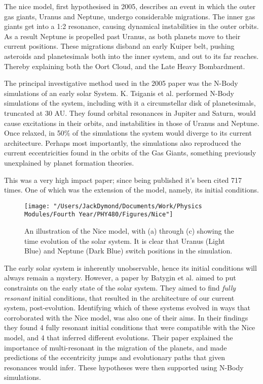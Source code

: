 \documentclass[a4paper,10pt]{article}
\begin{document}
The nice model, first hypothesised in 2005\cite{Nice}, describes an event in which the outer gas giants, Uranus and Neptune, undergo considerable migrations. The inner gas giants get into a 1:2 resonance, causing dynamical instabilities in the outer orbits. As a result Neptune is propelled past Uranus, as both planets move to their current positions. These migrations disband an early Kuiper belt, pushing asteroids and planetesimals both into the inner system, and out to its far reaches. Thereby explaining both the Oort Cloud, and the Late Heavy Bombardment. 

The principal investigative method used in the 2005 paper was the N-Body simulations of an early solar System. K. Tsiganis et al. performed N-Body simulations of the system, including with it a circumstellar disk of planetesimals, truncated at 30 AU. They found orbital resonances in Jupiter and Saturn, would cause excitations in their orbits, and instabilities in those of Uranus and Neptune. Once relaxed, in 50\% of the simulations the system would diverge to its current architecture. Perhaps most importantly, the simulations also reproduced the current eccentricities found in the orbits of the Gas Giants, something previously unexplained by planet formation theories.

This was a very high impact paper; since being published it's been cited 717 times. One of which was the extension of the model, namely, its initial conditions. 

\begin{figure}[h!]
\centering
\texttt{[image: "/Users/JackDymond/Documents/Work/Physics Modules/Fourth Year/PHY480/Figures/Nice"]}
\caption{An illustration of the Nice model, with (a) through (c) showing the time evolution of the solar system. It is clear that Uranus (Light Blue) and Neptune (Dark Blue) switch positions in the simulation.}
\label{NiceFig}
\end{figure}

The early solar system is inherently unobservable, hence its initial conditions will always remain a mystery. However, a paper by Batygin et al. aimed to put constraints on the early state of the solar system\cite{Initial}. They aimed to find \textit{fully resonant} initial conditions, that resulted in the architecture of our current system, post-evolution. Identifying which of these systems evolved in ways that corroborated with the Nice model, was also one of their aims. In their findings they found 4 fully resonant initial conditions that were compatible with the Nice model, and 4 that inferred different evolutions. Their paper explained the importance of multi-resonant in the migration of the planets, and made predictions of the eccentricity jumps and evolutionary paths that given resonances would infer. These hypotheses were then supported using N-Body simulations.
\end{document}
